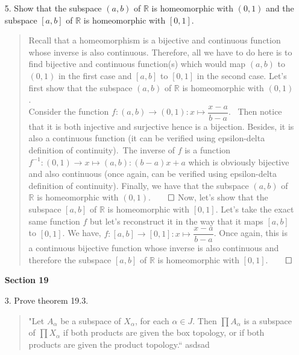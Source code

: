 \documentclass[12pt, a4paper]{article}
\newcommand{\reals}{\mathbb{R}} %
\newcommand\und[1]{\underline{\smash{#1}}}
\newcommand{\rarr}{\rightarrow}
\begin{document}
\begin{itemize}
\item[5.]
Show that the subspace $(a, b)$ of $\reals$ is homeomorphic with $(0, 1)$
and the subspace $[a, b]$ of $\reals$ is homeomorphic with $[0, 1]$.
\begin{quote}
Recall that a homeomorphism is a bijective and continuous function whose inverse is also continuous.
Therefore, all we have to do here is to find bijective and continuous function(s) which would map $(a, b)$ to $(0, 1)$
in the first case and $[a, b]$ to $[0, 1]$ in the second case.
\newline
\newline
Let's first show that the subspace $(a, b)$ of $\reals$ is homeomorphic with $(0, 1)$.\\
\vspace{0.1cm}
Consider the function $f : (a, b) \rarr (0, 1) : x \mapsto \dfrac{x - a}{b - a}$.\
\vspace{0.1cm}
Then notice that it is both injective and surjective hence is a bijection.
Besides, it is also a continuous function (it can be verified using epsilon-delta definition of continuity).\
The inverse of $f$ is a function $f^{-1} : (0, 1) \rarr x \mapsto (a, b) : (b - a)x + a$ which
is obviously bijective and also continuous (once again, can be verified using epsilon-delta definition of continuity).
Finally, we have that the subspace $(a, b)$ of $\reals$ is homeomorphic with $(0, 1)$.$\qed$
\newline
\newline
Now, let's show that the subspace $[a, b]$ of $\reals$ is homeomorphic with $[0, 1]$.
Let's take the exact same function $f$ but let's reconstruct it in the way that it maps $[a, b]$
to $[0, 1]$. We have, $f : [a, b] \rarr [0, 1] : x \mapsto \dfrac{x - a}{b - a}$.
Once again, this is a continuous bijective function whose inverse is also continuous
and therefore the subspace $[a, b]$ of $\reals$ is homeomorphic with $[0, 1]$.$\qed$
\end{quote}

\item[]
\item[]
\item[]
{\large \textbf{Section 19}}
\vspace{0.3cm}

\item[3.]
Prove theorem 19.3.
\begin{quote}
\und{\textbf{Theorem 19.3}}
\vspace{0.2cm}
\newline
"Let $A_\alpha$ be a subspace of $X_\alpha$, for each $\alpha \in J$.
Then $\prod A_\alpha$ is a subspace of $\prod X_\alpha$ if both products are given the box topology,
or if both products are given the product topology.``
\newline
\newline
asdsad
\end{quote}


\end{itemize}
\end{document}
